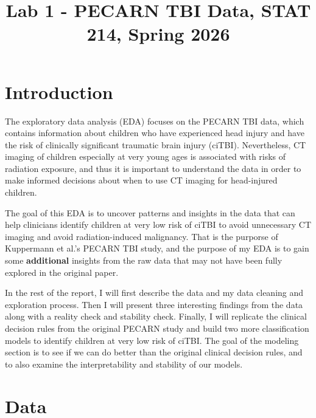 \documentclass[10pt,letterpaper]{article}
\title{Lab 1 - PECARN TBI Data, STAT 214, Spring 2026}
\begin{document}
\maketitle


\section{Introduction}\label{introduction}



The exploratory data analysis (EDA) focuses on the PECARN TBI data, which contains information about children who have experienced head injury and have the risk of clinically significant traumatic brain injury (ciTBI). 
Nevertheless, CT imaging of children especially at very young ages is associated with risks of radiation exposure, and thus it is important to understand the data in order to make informed decisions about when to use CT imaging for head-injured children.

The goal of this EDA is to uncover patterns and insights in the data that can help clinicians identify children at very low risk of ciTBI to avoid unnecessary CT imaging and avoid radiation-induced malignancy.
That is the purporse of Kuppermann et al.'s PECARN TBI study, and the purpose of my EDA is to gain some \textbf{additional} insights from the raw data that may not have been fully explored in the original paper.


In the rest of the report, I will first describe the data and my data cleaning and exploration process. Then I will present three interesting findings from the data along with a reality check and stability check. 
Finally, I will replicate the clinical decision rules from the original PECARN study and build two more classification models to identify children at very low risk of ciTBI. The goal of the modeling section is to see if we can do better than the original clinical decision rules, and to also examine the interpretability and stability of our models.

\section{Data}\label{data}
\end{document}
